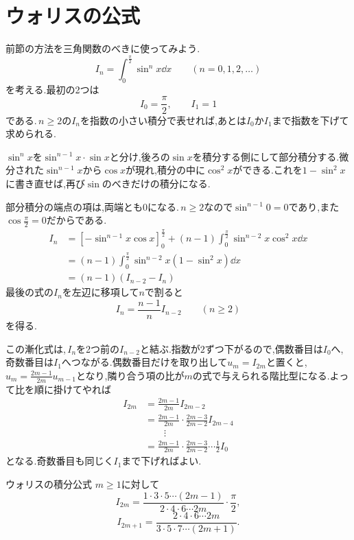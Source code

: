 \section{ウォリスの公式}\label{節:ウォリス公式}

前節の方法を三角関数のべきに使ってみよう.
\[
 I_n=\int_0^{\frac{\pi}{2}}\sin^n x\dd x
 \qquad(n=0,1,2,\ldots)
\]
を考える.最初の2つは
\[
 I_0=\frac{\pi}{2},\qquad I_1=1
\]
である.\,$n\ge2$の$I_n$を指数の小さい積分で表せれば,あとは$I_0$か$I_1$まで指数を下げて求められる.

$\sin^n x$を$\sin^{n-1}x\cdot\sin x$と分け,後ろの$\sin x$を積分する側にして部分積分する.微分された$\sin^{n-1}x$から$\cos x$が現れ,積分の中に$\cos^2x$ができる.これを$1-\sin^2x$に書き直せば,再び$\sin$のべきだけの積分になる.

部分積分の端点の項は,両端とも$0$になる.\,$n\ge2$なので$\sin^{n-1}0=0$であり,また$\cos\frac\pi2=0$だからである.
\begin{align*}
 I_n
 &=\left[-\sin^{n-1}x\cos x\right]_0^{\frac{\pi}{2}}
 +(n-1)\int_0^{\frac{\pi}{2}}\sin^{n-2}x\cos^2x\dd x\\
 &=(n-1)\int_0^{\frac{\pi}{2}}\sin^{n-2}x(1-\sin^2x)\dd x\\
 &=(n-1)(I_{n-2}-I_n)
\end{align*}
最後の式の$I_n$を左辺に移項して$n$で割ると
\begin{equation}\label{式:ウォリス漸化式}
 I_n=\frac{n-1}{n}I_{n-2}\qquad(n\ge2)
\end{equation}
を得る.

この漸化式は,\,$I_n$を2つ前の$I_{n-2}$と結ぶ.指数が$2$ずつ下がるので,偶数番目は$I_0$へ,奇数番目は$I_1$へつながる.偶数番目だけを取り出して$u_m=I_{2m}$と置くと,\,$u_m=\frac{2m-1}{2m}u_{m-1}$となり,隣り合う項の比が$m$の式で与えられる階比型になる.よって比を順に掛けてやれば
\begin{align*}
 I_{2m}
 &=\frac{2m-1}{2m}I_{2m-2}\\
 &=\frac{2m-1}{2m}\cdot\frac{2m-3}{2m-2}I_{2m-4}\\
 &\qquad\vdots\\
 &=\frac{2m-1}{2m}\cdot\frac{2m-3}{2m-2}\cdots\frac12I_0
\end{align*}
となる.奇数番目も同じく$I_1$まで下げればよい.

\begin{theorem}{ウォリスの積分公式}
$m\ge1$に対して
\begin{equation}\label{式:ウォリス偶数}
 I_{2m}
 =\frac{1\cdot3\cdot5\cdots(2m-1)}{2\cdot4\cdot6\cdots2m}
   \cdot\frac{\pi}{2},
\end{equation}
\begin{equation}\label{式:ウォリス奇数}
 I_{2m+1}
 =\frac{2\cdot4\cdot6\cdots2m}{3\cdot5\cdot7\cdots(2m+1)}.
\end{equation}
\end{theorem}

